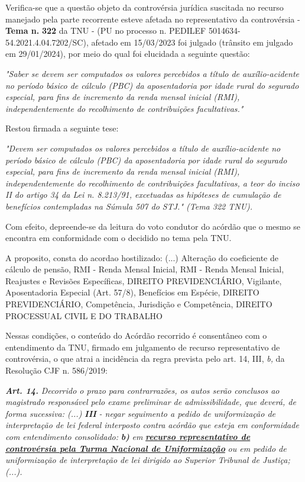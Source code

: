 \documentclass[12pt]{article}
\begin{document}
\justifying
\noindent Verifica-se que a questão objeto da controvérsia jurídica suscitada no recurso manejado pela parte recorrente esteve afetada no representativo da controvérsia - \textbf{Tema n. }\textbf{322} da TNU - (PU no processo n. PEDILEF 5014634-54.2021.4.04.7202/SC),  afetado em 15/03/2023 foi julgado (trânsito em julgado em 29/01/2024), por meio do qual foi elucidada a seguinte questão:

\noindent \textit{"Saber se devem ser computados os valores percebidos a título de auxílio-acidente no período básico de cálculo (PBC) da aposentadoria por idade rural do segurado especial, para fins de incremento da renda mensal inicial (RMI), independentemente do recolhimento de contribuições facultativas."}

\noindent Restou firmada a seguinte tese:

\noindent \textit{"Devem ser computados os valores percebidos a título de auxílio-acidente no período básico de cálculo (PBC) da aposentadoria por idade rural do segurado especial, para fins de incremento da renda mensal inicial (RMI), independentemente do recolhimento de contribuições facultativas, a teor do inciso II do artigo 34 da Lei n. 8.213/91, excetuadas as hipóteses de cumulação de benefícios contempladas na Súmula 507 do STJ." (Tema 322 TNU).}

\noindent Com efeito, depreende-se da leitura do voto condutor do acórdão que o mesmo se encontra em conformidade com o decidido no  tema pela TNU.

\noindent A proposito, consta do acordao hostilizado: (...) Alteração do coeficiente de cálculo de pensão, RMI - Renda Mensal Inicial, RMI - Renda Mensal Inicial, Reajustes e Revisões Específicas, DIREITO PREVIDENCIÁRIO, Vigilante, Aposentadoria Especial (Art. 57/8), Benefícios em Espécie, DIREITO PREVIDENCIÁRIO, Competência, Jurisdição e Competência, DIREITO PROCESSUAL CIVIL E DO TRABALHO

\noindent Nessas condições, o conteúdo do Acórdão recorrido é consentâneo com o entendimento da TNU, firmado em julgamento de recurso representativo de controvérsia, o que atrai a incidência da regra prevista pelo art. 14, III, \textit{b,} da Resolução CJF n. 586/2019:

\noindent \textit{\textbf{Art. 14.}}\textit{ Decorrido o prazo para contrarrazões, os autos serão conclusos ao magistrado responsável pelo exame preliminar de admissibilidade, que deverá, de forma sucessiva: (...) }\textit{\textbf{III }}\textit{- negar seguimento a pedido de uniformização de interpretação de lei federal interposto contra acórdão que esteja em conformidade com entendimento consolidado: }\textit{\textbf{b)}}\textit{ em }\uline{\textit{\textbf{recurso representativo de controvérsia pela Turma Nacional de Uniformização}}}\textit{ ou em pedido de uniformização de interpretação de lei dirigido ao Superior Tribunal de Justiça;(...).}
\end{document}
